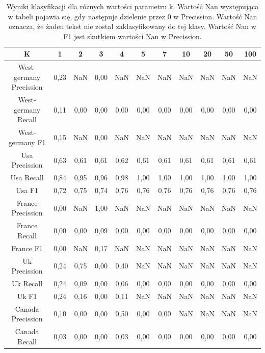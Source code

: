 \documentclass{classrep}
\begin{document}
\newpage
\begin{table}[h!]
\caption{Wyniki klasyfikacji dla różnych wartości parametru k. Wartość Nan występująca w tabeli pojawia się, gdy następuje dzielenie przez 0 w Precission. Wartość Nan oznacza, że żaden tekst nie został zaklasyfikowany do tej klasy. Wartość Nan w F1 jest skutkiem wartości Nan w Precission.}
\centering
\vspace{0.1cm}
 \begin{tabular}{c c c c c c c c c c c}

    \textbf{K} & \textbf{1}   & \textbf{2}  & \textbf{3}  & \textbf{4}  & \textbf{5} & \textbf{7}   & \textbf{10}  & \textbf{20}  & \textbf{50}  & \textbf{100} \\

\hline
West-germany Precission 	& 0,23 & NaN & 0,00 & NaN  & NaN & NaN  & NaN & NaN & NaN  & NaN\\
West-germany Recall 		& 0,11 & 0,00 & 0,00 & 0,00 & 0,00 & 0,00 & 0,00 & 0,00 & 0,00 & 0,00\\
West-germany F1		& 0,15 & NaN & 0,00 & NaN  & NaN & NaN  & NaN & NaN & NaN  & NaN \\
\hline
Usa Precission 			& 0,63 & 0,61 & 0,61 & 0,62 & 0,61 & 0,61 & 0,61 & 0,61 & 0,61 & 0,61 \\
Usa Recall				& 0,84 & 0,95 & 0,96 & 0,98 & 1,00 & 1,00 & 1,00 & 1,00 & 1,00 & 1,00 \\
Usa F1			 	& 0,72 & 0,75 & 0,74 & 0,76 & 0,76 & 0,76 & 0,76 & 0,76 & 0,76 & 0,76 \\
\hline
France Precission 		& 0,00 & NaN & 1,00 & NaN  & NaN  & NaN & NaN & NaN  & NaN & NaN \\
France Recall 			& 0,00 & 0,00 & 0,09 & 0,00 & 0,00 & 0,00 & 0,00 & 0,00 & 0,00 & 0,00 \\
France F1 				& 0,00 & NaN & 0,17 & NaN  & NaN  & NaN & NaN & NaN  & NaN & NaN\\
\hline
Uk Precission 			& 0,24 & 0,75 & 0,00 & 0,40 & NaN  & NaN & NaN & NaN  & NaN & NaN\\
Uk Recall 				& 0,24 & 0,09 & 0,00 & 0,06 & 0,00 & 0,00 & 0,00 & 0,00 & 0,00 & 0,00\\
Uk F1 				& 0,24 & 0,16 & 0,00 & 0,11 & NaN  & NaN & NaN & NaN  & NaN & NaN \\
\hline
Canada Precission		& 0,10 & 0,00 & 0,00 & 0,50 & 0,00 & 0,00 & NaN & NaN  & NaN & NaN\\
Canada Recall 			& 0,03 & 0,00 & 0,00 & 0,03 & 0,00 & 0,00 & 0,00 & 0,00 & 0,00 & 0,00 \\

\end{tabular}
\end{table}
\end{document}
